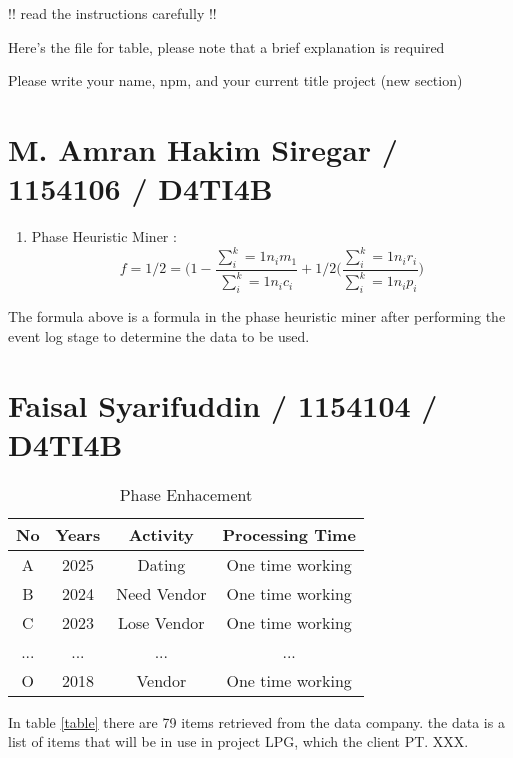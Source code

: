 !! read the instructions carefully !!

Here's the file for table, please note that a brief explanation is required

Please write your name, npm, and your current title project (new section)



\section{M. Amran Hakim Siregar / 1154106 / D4TI4B}
\begin{enumerate}
    \item Phase Heuristic Miner :
    \begin{equation}
        f=1/2=\bigg(1-\frac{\sum_{i}^{k}= 1 n_{i}m_{1}}{\sum_{i}^{k} = 1 n_{i}c_{i}}\bigg+ 1/2\big(\frac{\sum_{i}^{k}=1 n_{i}r_{i}}{\sum_{i}^{k}= 1 n_{i}p_{i}}\bigg)
    \end{equation}
\end{enumerate}
\par
The formula above is a formula in the phase heuristic miner after performing the event log stage to determine the data to be used.

\section{Faisal Syarifuddin / 1154104 / D4TI4B}

\begin{center}
    \begin{table}[hhhh]
    \caption{Phase Enhacement}
        \centering
        \begin{tabular}{cccc}
        \hline No & Years & Activity & Processing Time\\
        \hline
            A & 2025 & Dating & One time working  \\
            B & 2024 & Need Vendor & One time working  \\
            C & 2023 & Lose Vendor & One time working  \\
            ... & ... & ... & ...  \\
            O & 2018 & Vendor & One time working  \\
        \hline
        \end{tabular}
    \end{table}
\end{center}

\par In table \ref{table} there are 79 items retrieved from the data company. the data is a list of items that will be in use in project LPG, which the client PT. XXX.

